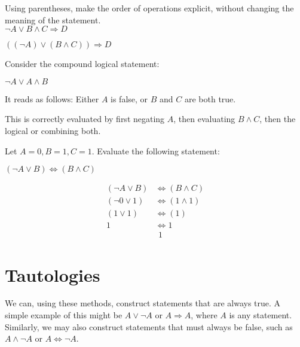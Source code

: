 \begin{exercise}
  Using parentheses, make the order of operations explicit, without changing the
  meaning of the statement.\\
  \(\neg A \lor B \land C \Rightarrow D\)

  \begin{sol}
    \(((\neg A) \lor (B \land C)) \Rightarrow D\)
  \end{sol}
\end{exercise}

\begin{example}
  Consider the compound logical statement:\\
  \begin{center}
    \(\neg A \lor A \land B\)
  \end{center}
  It reads as follows: Either \(A\) is false, or \(B\) and \(C\) are both true.

  This is correctly evaluated by first negating \(A\), then evaluating
  \(B \land C\), then the logical or combining both.
\end{example}

\begin{exercise}
  Let \(A=0, B=1, C=1\). Evaluate the following statement:\\
  \begin{center}
    \((\neg A \lor B) \Leftrightarrow (B \land C)\)
  \end{center}

  \begin{sol}
    \begin{align*}
      (\neg A \lor B) &\Leftrightarrow (B \land C)\\
      (\neg 0 \lor 1) &\Leftrightarrow (1 \land 1)\\
      (1 \lor 1) &\Leftrightarrow (1)\\
      1 &\Leftrightarrow 1\\
      &\ \, 1
    \end{align*}
  \end{sol}
\end{exercise}

\section{Tautologies}

We can, using these methods, construct statements that are always true.
A simple example of this might be \(A \lor \neg A\) or \(A \Rightarrow A\),
where \(A\) is any statement. Similarly, we may also construct statements that
must always be false, such as \(A \land \neg A\) or \(A \Leftrightarrow \neg A\).

